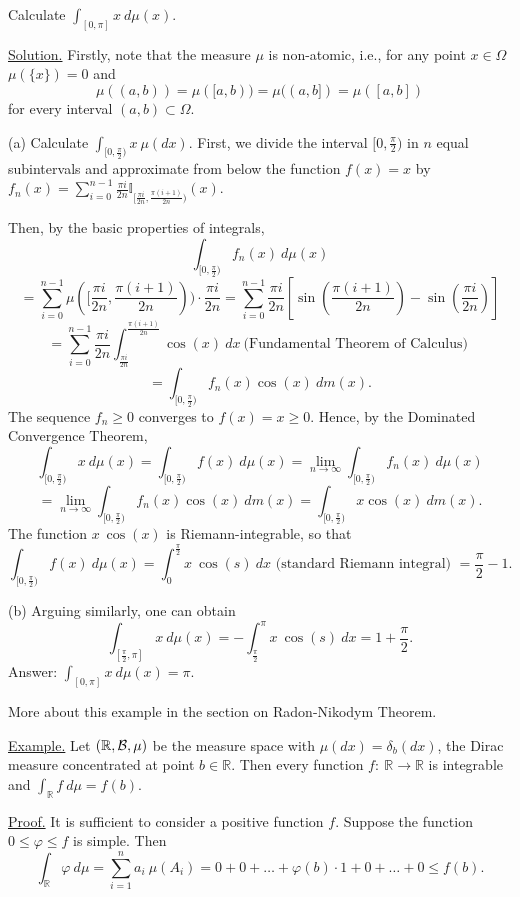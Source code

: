 \documentclass[a4paper,10pt]{article}
\def\RR{\mathbb{R}}
\def\II{\mathbb{I}}
\newcommand{\1}[1]{\mathbf{1}_{\{#1\}}}
\begin{document}
Calculate $\int_{[0,\pi]}x~d\mu(x)$.

\underline{Solution.} Firstly, note that the measure $\mu$ is non-atomic, i.e., for any point $x\in\Omega$ $\mu(\{x\})=0$ and
$$\mu((a,b))=\mu([a,b))=\mu((a,b])=\mu([a,b])$$
for every interval $(a,b)\subset\Omega$.

(a) Calculate $\int_{[0,\frac{\pi}{2})} x~\mu(dx)$. First, we divide the interval $[0,\frac{\pi}{2})$ in $n$ equal subintervals and approximate from below the function $f(x)=x$ by $f_n(x)=\sum_{i=0}^{n-1} \frac{\pi i}{2n}\II_{[\frac{\pi i}{2n},\frac{\pi(i+1)}{2n})}(x)$.\vspace{2cm}

Then, by the basic properties of integrals,
$$\int_{[0,\frac{\pi}{2})} f_n(x)~d\mu(x)$$
$$=\sum_{i=0}^{n-1} \mu([\frac{\pi i}{2n},\frac{\pi(i+1)}{2n}))\cdot\frac{\pi i}{2n}=\sum_{i=0}^{n-1}\frac{\pi i}{2n}\left[\sin(\frac{\pi(i+1)}{2n})-\sin(\frac{\pi i}{2n})\right]$$
$$=\sum_{i=0}^{n-1}\frac{\pi i}{2n}\int_{\frac{\pi i}{2n}}^{\frac{\pi(i+1)}{2n}} \cos(x)~dx~\mbox{
(Fundamental Theorem of Calculus) }$$
$$=\int_{[0,\frac{\pi}{2})} f_n(x)\cos(x)~dm(x).$$
The sequence $f_n\ge 0$ converges to $f(x)=x\ge 0$. Hence, by the Dominated Convergence Theorem,
$$\int_{[0,\frac{\pi}{2})} x~d\mu(x)=\int_{[0,\frac{\pi}{2})} f(x)~d\mu(x)=\lim_{n\to\infty} \int_{[0,\frac{\pi}{2})} f_n(x)~d\mu(x)$$
$$=\lim_{n\to\infty} \int_{[0,\frac{\pi}{2})} f_n(x)\cos(x)~dm(x)=\int_{[0,\frac{\pi}{2})} x\cos(x)~dm(x).$$
The function $x~\cos(x)$ is Riemann-integrable, so that
$$\int_{[0,\frac{\pi}{2})} f(x)~d\mu(x)=\int_0^{\frac{\pi}{2}} x~\cos(s)~dx \mbox{ (standard Riemann integral) }=\frac{\pi}{2}-1.$$

(b) Arguing similarly, one can obtain
$$\int_{[\frac{\pi}{2},\pi]} x~d\mu(x)=-\int_{\frac{\pi}{2}}^{\pi} x~\cos(s)~dx=1+\frac{\pi}{2}.$$
Answer: $\int_{[0,\pi]} x~d\mu(x)=\pi$.

More about this example in the section on Radon-Nikodym Theorem.
\vspace{3mm}

\underline{Example.}
Let $(\RR,{\cal B},\mu)$ be the measure space with $\mu(dx)=\delta_b(dx)$, the Dirac measure concentrated at point $b\in\RR$. Then  every function $f:~\RR\to\RR$ is integrable and $\int_{\RR} f~d\mu=f(b)$.

\underline{Proof.} It is sufficient to consider a positive function $f$. Suppose the function $0\le\varphi\le f$ is simple. Then
$$\int_{\RR}\varphi~d\mu=\sum_{i=1}^n a_i~\mu(A_i)=0+0+\ldots +\varphi(b)\cdot 1+0+\ldots +0\le f(b).$$\vspace{3cm}
\end{document}
